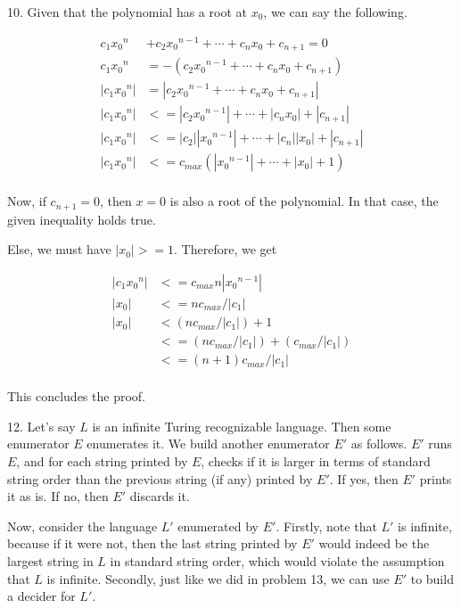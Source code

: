 \documentclass{article}
\begin{document}
10. Given that the polynomial has a root at $x_0$, we can say the following.

\begin{align*}
    c_1 {x_0}^n &+ c_2 {x_0}^{n - 1} + \cdots + c_n x_0 + c_{n + 1} = 0 \\
    c_1 {x_0}^n &= -(c_2 {x_0}^{n - 1} + \cdots + c_n x_0 + c_{n + 1}) \\
    |c_1 {x_0}^n| &= |c_2 {x_0}^{n - 1} + \cdots + c_n x_0 + c_{n + 1}| \\
    |c_1 {x_0}^n| &<= |c_2 {x_0}^{n - 1}| + \cdots + |c_n x_0| + |c_{n + 1}| \\
    |c_1 {x_0}^n| &<= |c_2| |{x_0}^{n - 1}| + \cdots + |c_n| |x_0| + |c_{n + 1}| \\
    |c_1 {x_0}^n| &<= c_{max} (|{x_0}^{n - 1}| + \cdots + |x_0| + 1) \\
\end{align*}

Now, if $c_{n + 1} = 0$, then $x = 0$ is also a root of the polynomial. In that case, the given inequality holds true.

Else, we must have $|x_0| >= 1$. Therefore, we get

\begin{align*}
    |c_1 {x_0}^n| &<= c_{max} n |{x_0}^{n - 1}| \\
    |x_0| &<= n c_{max} / |c_1| \\
    |x_0| &< (n c_{max} / |c_1|) + 1 \\
          &<= (n c_{max} / |c_1|) + (c_{max}/|c_1|) \\
          &<= (n + 1) c_{max} / |c_1| \\
\end{align*}

This concludes the proof.

12. Let's say $L$ is an infinite Turing recognizable language. Then some enumerator $E$ enumerates it. We build another enumerator $E'$ as follows. $E'$ runs $E$, and for each string printed by $E$, checks if it is larger in terms of standard string order than the previous string (if any) printed by $E'$. If yes, then $E'$ prints it as is. If no, then $E'$ discards it.

Now, consider the language $L'$ enumerated by $E'$. Firstly, note that $L'$ is infinite, because if it were not, then the last string printed by $E'$ would indeed be the largest string in $L$ in standard string order, which would violate the assumption that $L$ is infinite. Secondly, just like we did in problem 13, we can use $E'$ to build a decider for $L'$.
\end{document}
